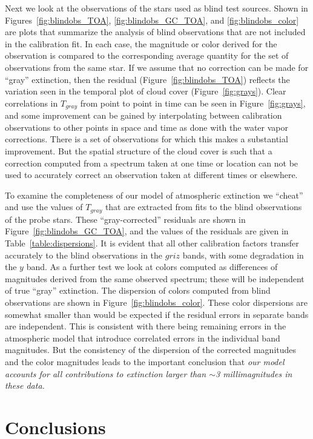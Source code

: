 \documentclass[manuscript]{aastex}
\begin{document}
Next we look at the observations of the stars used as blind test sources.
Shown in Figures~\ref{fig:blindobs_TOA},  \ref{fig:blindobs_GC_TOA}, and \ref{fig:blindobs_color}
are plots that summarize the analysis of blind observations that are not included in the calibration fit.
In each case, the magnitude or color derived for the observation is compared to the corresponding average quantity for the set of observations from the same star.
If we assume that no correction can be made for ``gray'' extinction, then the residual (Figure~\ref{fig:blindobs_TOA})
reflects the variation seen in the temporal plot of cloud cover (Figure~\ref{fig:grays}).
Clear correlations in $T_{gray}$ from point to point in time can be seen in Figure~\ref{fig:grays}, and some improvement can be gained by interpolating
between calibration observations to other points in space and time as done with the water vapor corrections.
There is a set of observations for which this makes a substantial improvement.
But the spatial structure of the cloud cover is such that a correction computed from a spectrum taken at one time or
location can not be used to accurately correct an observation taken at different times or elsewhere.

To examine the completeness of our model of atmospheric extinction we ``cheat''
and use the values of $T_{gray}$ that are extracted from fits to the blind observations of the probe stars.
These ``gray-corrected'' residuals are shown in Figure~\ref{fig:blindobs_GC_TOA}, and the values of the residuals are given in Table~\ref{table:dispersions}.
It is evident that all other calibration factors transfer accurately to the blind observations in the $griz$ bands, with some degradation in the $y$ band.
As a further test we look at colors computed as differences of magnitudes derived from the same observed spectrum; 
these will be independent of true ``gray'' extinction.
The dispersion of colors computed from blind observations are shown in Figure~\ref{fig:blindobs_color}.
These color dispersions are somewhat smaller than would be expected if the residual errors in separate bands are independent.
This is consistent with there being remaining errors in the atmospheric model that introduce correlated errors in the individual band magnitudes.
But the consistency of the dispersion of the corrected magnitudes and the color magnitudes leads to
the important conclusion that {\it our model accounts for all contributions to extinction larger than $\sim$3 millimagnitudes in these data.}


\section{Conclusions}
\end{document}
